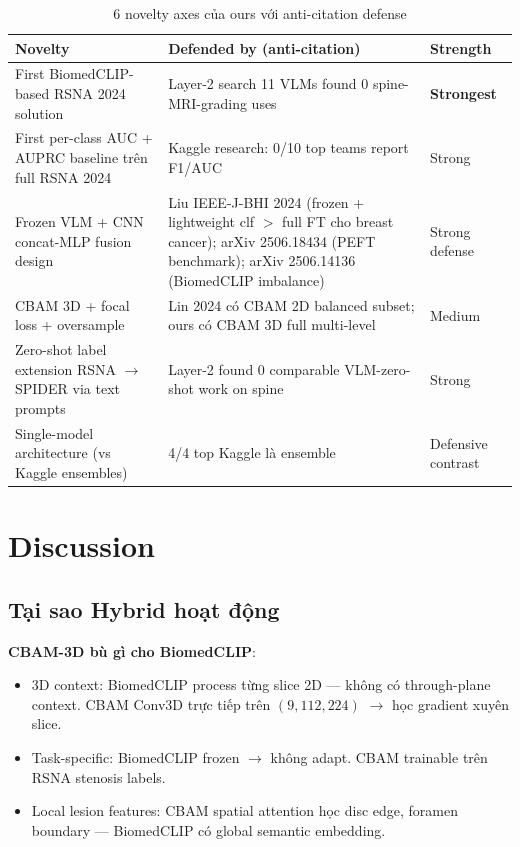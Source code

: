 \documentclass[11pt,a4paper]{article}
\newcommand{\best}[1]{\textcolor{best}{\textbf{#1}}}
\begin{document}
\begin{table}[h]
\centering
\caption{6 novelty axes của ours với anti-citation defense}
\small
\begin{tabular}{@{}p{5cm}p{6cm}p{2cm}@{}}
\toprule
\rowcolor{tablehdr}
Novelty & Defended by (anti-citation) & Strength \\
\midrule
First BiomedCLIP-based RSNA 2024 solution & Layer-2 search 11 VLMs found 0 spine-MRI-grading uses & \best{Strongest} \\
First per-class AUC + AUPRC baseline trên full RSNA 2024 & Kaggle research: 0/10 top teams report F1/AUC & Strong \\
Frozen VLM + CNN concat-MLP fusion design & Liu IEEE-J-BHI 2024 (frozen + lightweight clf $>$ full FT cho breast cancer); arXiv 2506.18434 (PEFT benchmark); arXiv 2506.14136 (BiomedCLIP imbalance) & Strong defense \\
CBAM 3D + focal loss + oversample & Lin 2024 có CBAM 2D balanced subset; ours có CBAM 3D full multi-level & Medium \\
Zero-shot label extension RSNA $\to$ SPIDER via text prompts & Layer-2 found 0 comparable VLM-zero-shot work on spine & Strong \\
Single-model architecture (vs Kaggle ensembles) & 4/4 top Kaggle là ensemble & Defensive contrast \\
\bottomrule
\end{tabular}
\end{table}

\section{Discussion}

\subsection{Tại sao Hybrid hoạt động}

\noindent\textbf{CBAM-3D bù gì cho BiomedCLIP}:
\begin{itemize}[leftmargin=*]
\item 3D context: BiomedCLIP process từng slice 2D --- không có
through-plane context. CBAM Conv3D trực tiếp trên $(9, 112, 224)$
$\to$ học gradient xuyên slice.
\item Task-specific: BiomedCLIP frozen $\to$ không adapt. CBAM
trainable trên RSNA stenosis labels.
\item Local lesion features: CBAM spatial attention học disc edge,
foramen boundary --- BiomedCLIP có global semantic embedding.
\end{itemize}
\end{document}
